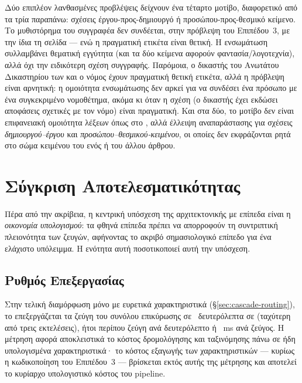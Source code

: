 Δύο επιπλέον λανθασμένες προβλέψεις δείχνουν ένα τέταρτο μοτίβο, διαφορετικό
από τα τρία παραπάνω: σχέσεις έργου-προς-δημιουργό ή προσώπου-προς-θεσμικό
κείμενο.
Το μυθιστόρημα  του συγγραφέα  δεν
συνδέεται, στην πρόβλεψη του Επιπέδου~3, με την ίδια τη σελίδα  --- ενώ η πραγματική ετικέτα είναι θετική.
Η ενσωμάτωση συλλαμβάνει
θεματική εγγύτητα (και τα δύο κείμενα αφορούν φαντασία/λογοτεχνία), αλλά όχι
την ειδικότερη σχέση συγγραφής.
Παρόμοια, ο δικαστής του Ανωτάτου Δικαστηρίου
των   και ο νόμος  έχουν πραγματική θετική ετικέτα, αλλά η πρόβλεψη είναι
αρνητική: η ομοιότητα ενσωμάτωσης δεν αρκεί για να συνδέσει ένα πρόσωπο με ένα
συγκεκριμένο νομοθέτημα, ακόμα κι όταν η σχέση (ο δικαστής έχει εκδώσει
αποφάσεις σχετικές με τον νόμο) είναι πραγματική.
Και στα δύο, το μοτίβο δεν
είναι επιφανειακή ομοιότητα λέξεων όπως στο , αλλά έλλειψη
αναπαράστασης για σχέσεις \textit{δημιουργού--έργου} και
\textit{προσώπου--θεσμικού-κειμένου}, οι οποίες δεν εκφράζονται ρητά στο σώμα
κειμένου του ενός ή του άλλου άρθρου.


\section{Σύγκριση Αποτελεσματικότητας}
\label{sec:efficiency}

Πέρα από την ακρίβεια, η κεντρική υπόσχεση της αρχιτεκτονικής με επίπεδα είναι
η \textit{οικονομία υπολογισμού}: τα φθηνά επίπεδα πρέπει να απορροφούν τη
συντριπτική πλειονότητα των ζευγών, αφήνοντας το ακριβό σημασιολογικό επίπεδο για
ένα ελάχιστο υπόλειμμα.
Η ενότητα αυτή ποσοτικοποιεί αυτή την υπόσχεση.

\subsection{Ρυθμός Επεξεργασίας}
\label{subsec:throughput}

Στην τελική διαμόρφωση μόνο με ευρετικά χαρακτηριστικά (\S\ref{sec:cascade-routing}),
το  επεξεργάζεται τα \ValSplitSize{} ζεύγη του συνόλου επικύρωσης σε
\ThroughputSec~δευτερόλεπτα σε  (ταχύτερη από τρεις εκτελέσεις), ήτοι περίπου
\ThroughputRate{} ζεύγη ανά δευτερόλεπτο ή \ThroughputLatency~ms ανά ζεύγος.
Η μέτρηση αφορά αποκλειστικά
το κόστος δρομολόγησης και ταξινόμησης πάνω σε ήδη υπολογισμένα χαρακτηριστικά· το
κόστος εξαγωγής των χαρακτηριστικών --- κυρίως η κωδικοποίηση 
του Επιπέδου~3 --- βρίσκεται εκτός αυτής της μέτρησης και αποτελεί το κυρίαρχο
υπολογιστικό κόστος του pipeline.

